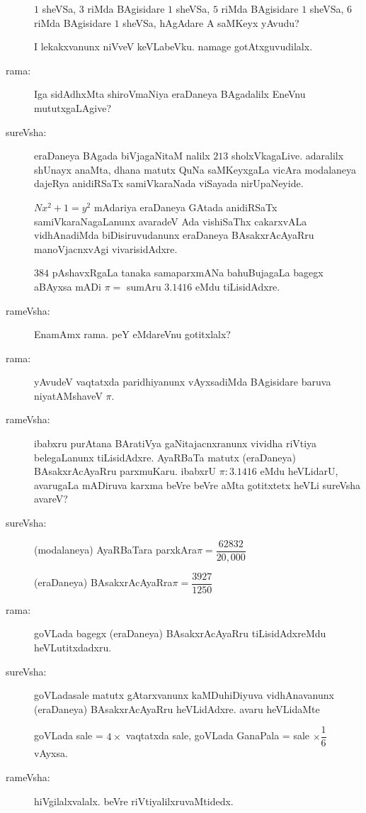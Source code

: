 \begin{description}
$1$ sheVSa, $3$ riMda BAgisidare $1$ sheVSa, $5$ riMda BAgisidare $1$ sheVSa, $6$ riMda BAgisidare $1$ sheVSa, hAgAdare A saMKeyx yAvudu?

I lekakxvanunx niVveV keVLabeVku. namage gotAtxguvudilalx.

\item[rama:] Iga sidAdhxMta shiroVmaNiya eraDaneya BAgadalilx EneVnu mututxgaLAgive?

\item[sureVsha:] eraDaneya BAgada biVjagaNitaM nalilx $213$ sholxVkagaLive. adaralilx shUnayx anaMta, dhana matutx QuNa saMKeyxgaLa vicAra modalaneya dajeRya anidiRSaTx samiVkaraNada viSayada nirUpaNeyide.

$Nx^{2}+1=y^{2}$ mAdariya eraDaneya GAtada anidiRSaTx samiVkaraNagaLanunx avaradeV Ada vishiSaThx cakarxvALa vidhAnadiMda biDisiruvudanunx eraDaneya BAsakxrAcAyaRru manoVjacnxvAgi vivarisidAdxre.

$384$ pAshavxRgaLa tanaka samaparxmANa bahuBujagaLa bagegx aBAyxsa mADi $\pi=$ sumAru $3.1416$ eMdu tiLisidAdxre.

\item[rameVsha:] EnamAmx rama. peY eMdareVnu gotitxlalx?

\item[rama:] yAvudeV vaqtatxda paridhiyanunx vAyxsadiMda BAgisidare baruva niyatAMshaveV $\pi$.

\item[rameVsha:] ibabxru purAtana BAratiVya gaNitajacnxranunx vividha riVtiya belegaLanunx tiLisidAdxre. AyaRBaTa matutx (eraDaneya) BAsakxrAcAyaRru parxmuKaru. ibabxrU $\pi:3.1416$ eMdu heVLidarU, avarugaLa mADiruva karxma beVre beVre aMta gotitxtetx heVLi sureVsha avareV?

\item[sureVsha:] (modalaneya) AyaRBaTara parxkAra\quad $\pi=\dfrac{62832}{20,000}$

(eraDaneya) BAsakxrAcAyaRra\quad $\pi=\dfrac{3927}{1250}$

\item[rama:] goVLada bagegx (eraDaneya) BAsakxrAcAyaRru tiLisidAdxreMdu heVLutitxdadxru.

\item[sureVsha:] goVLadasale matutx gAtarxvanunx kaMDuhiDiyuva vidhAnavanunx (eraDaneya) BAsakxrAcAyaRru heVLidAdxre. avaru heVLidaMte 

goVLada sale = $4\times{}$ vaqtatxda sale, goVLada GanaPala = sale $\times\dfrac{1}{6}$ vAyxsa.

\item[rameVsha:] hiVgilalxvalalx. beVre riVtiyalilxruvaMtidedx.


\end{description}
